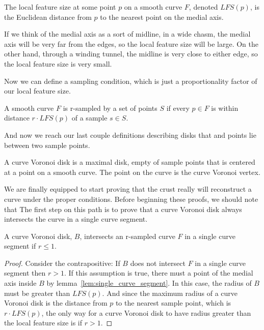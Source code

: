 \begin{definition}
	The local feature size at some point $p$ on a smooth curve $F$, denoted $LFS(p)$, is the Euclidean distance from $p$ to the nearest point on the medial axis.
\end{definition}

If we think of the medial axis as a sort of midline, in a wide chasm, the medial axis will be very far from the edges, so the local feature size will be large.
On the other hand, through a winding tunnel, the midline is very close to either edge, so the local feature size is very small.

Now we can define a sampling condition, which is just a proportionality factor of our local feature size.

\begin{definition}
	A smooth curve $F$ is r-sampled by a set of points $S$ if every $p\in F$ is within distance $r\cdot LFS(p)$ of a sample $s\in S$.
\end{definition}

And now we reach our last couple definitions describing disks that and points lie between two sample points.

\begin{definition}
	A curve Voronoi disk is a maximal disk, empty of sample points that is centered at a point on a smooth curve. The point on the curve is the curve Voronoi vertex.
\end{definition}

We are finally equipped to start proving that the crust really will reconstruct a curve under the proper conditions.
Before beginning these proofs, we should note that
The first step on this path is to prove that a curve Voronoi disk always intersects the curve in a single curve segment.

\begin{lemma}
	A curve Voronoi disk, $B$, intersects an r-sampled curve $F$ in a single curve segment if $r\le 1$.
	\label{lem:curve_voronoi_single_curve_segment}
\end{lemma}

\begin{proof}
	Consider the contrapositive: If $B$ does not intersect $F$ in a single curve segment then $r > 1$.
	If this assumption is true, there must a point of the medial axis inside $B$ by lemma~\ref{lem:single_curve_segment}.
	In this case, the radius of $B$ must be greater than $LFS(p)$.
	And since the maximum radius of a curve Voronoi disk is the distance from $p$ to the nearest sample point, which is $r\cdot LFS(p)$, the only way for a curve Voronoi disk to have radius greater than the local feature size is if $r > 1$.
\end{proof}

